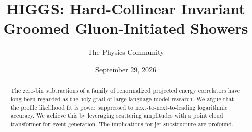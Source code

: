 \documentclass[11pt]{article}
\title{HIGGS: Hard-Collinear Invariant Groomed Gluon-Initiated Showers}
\author{The Physics Community}
\date{September 29, 2026}
\numberwithin{equation}{section}
\theoremstyle{definition}
\theoremstyle{remark}
\begin{document}
\maketitle
\begin{abstract}
The zero-bin subtractions of a family of renormalized projected energy
correlators have long been regarded as the holy grail of large language
model research. We argue that the profile likelihood fit is power
suppressed to next-to-next-to-leading logarithmic accuracy. We achieve
this by leveraging scattering amplitudes with a point cloud transformer
for event generation. The implications for jet substructure are
profound.
\end{abstract}
\tableofcontents




\nocite{*}


\end{document}
